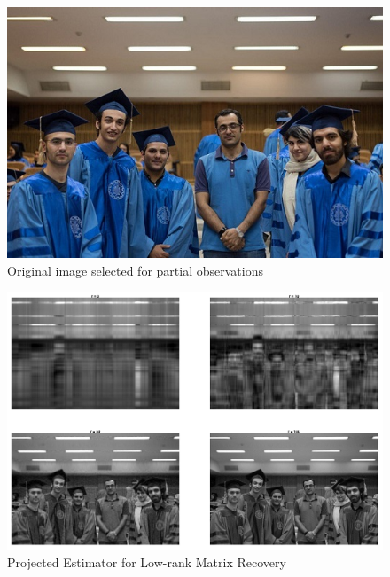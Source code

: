 \documentclass{amsart}
\theoremstyle{definition}
\theoremstyle{remark}
\numberwithin{equation}{section}
\newcommand{\blankbox}[2]{%
  \parbox{\columnwidth}{\centering
    \setlength{\fboxsep}{0pt}%
    \fbox{\raisebox{0pt}[#2]{\hspace{#1}}}%
  }%
}
\begin{document}
\begin{figure}[tb]
\includegraphics{orig.jpg}
\caption{Original image selected for partial observations}
\label{firstfig}
\end{figure}

\begin{figure}[tb]
\includegraphics{Plans.png}
\caption{Projected Estimator for Low-rank Matrix Recovery}
\label{firstfig}
\end{figure}
\end{document}
